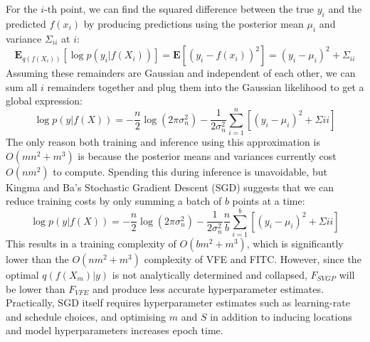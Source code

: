 For the $i$-th point, we can find the squared difference between the true $y_i$ and the predicted $f(x_i)$ by producing predictions using the posterior mean $\mu_i$ and variance $\Sigma_{ii}$ at $i$:
\begin{equation*}
    \textbf{E}_{q(f(X_i))} \left[ \log p(y_i | f(X_i)) \right] =  \textbf{E} \left[ (y_i - f(x_i))^2 \right] = (y_i - \mu_i)^2 + \Sigma_{ii}
\end{equation*}
Assuming these remainders are Gaussian and independent of each other, we can sum all $i$ remainders together and plug them into the Gaussian likelihood to get a global expression:
\begin{equation*}
    \log p(y | f(X)) = -\frac{n}{2} \log(2 \pi \sigma_n^2) - \frac{1}{2\sigma_n^2} \sum_{i=1}^{n} \left[ (y_i - \mu_i)^2 + \Sigma{ii} \right]
\end{equation*}
The only reason both training and inference using this approximation is $O(mn^2 + m^3)$ is because the posterior means and variances currently cost $O(nm^2)$ to compute. Spending this during inference is unavoidable, but Kingma and Ba's Stochastic Gradient Descent (SGD) \cite{adam} suggests that we can reduce training costs by only summing a batch of $b$ points at a time:
\begin{equation*}
    \log p(y | f(X)) = -\frac{n}{2} \log(2 \pi \sigma_n^2) - \frac{1}{2\sigma_n^2} \frac{n}{b} \sum_{i=1}^{b} \left[ (y_i - \mu_i)^2 + \Sigma{ii} \right]
\end{equation*}
This results in a training complexity of $O(bm^2 + m^3)$, which is significantly lower than the $O(nm^2 + m^3)$ complexity of VFE and FITC. However, since the optimal $q(f(X_m) | y)$ is not analytically determined and collapsed, $F_{SVGP}$ will be lower than $F_{VFE}$ and produce less accurate hyperparameter estimates. Practically, SGD itself requires hyperparameter estimates such as learning-rate and schedule choices, and optimising $m$ and $S$ in addition to inducing locations and model hyperparameters increases epoch time.




